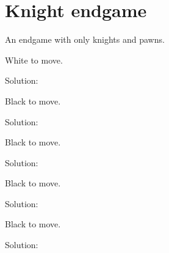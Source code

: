\documentclass{book}
\begin{document}
\section{Knight endgame}
An endgame with only knights and pawns.\begin{multicols}{2} 
\begin{samepage} 
\newgame 


 
\showboard
 
 White to move. 
 
Solution: 
 
\end{samepage}\begin{samepage} 
\newgame 


 
\showboard
 
 Black to move. 
 
Solution: 
 
\end{samepage}\begin{samepage} 
\newgame 


 
\showboard
 
 Black to move. 
 
Solution: 
 
\end{samepage}\begin{samepage} 
\newgame 


 
\showboard
 
 Black to move. 
 
Solution: 
 
\end{samepage}\begin{samepage} 
\newgame 


 
\showboard
 
 Black to move. 
 
Solution: 
 
\end{samepage}\begin{samepage} 
\newgame 


\end{samepage}
\end{multicols}
\end{document}
